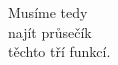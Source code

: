 \documentclass[preview]{standalone}
\begin{document}
\begin{center}
Musíme tedy\\najít průsečík\\těchto tří funkcí.
\end{center}
\end{document}
